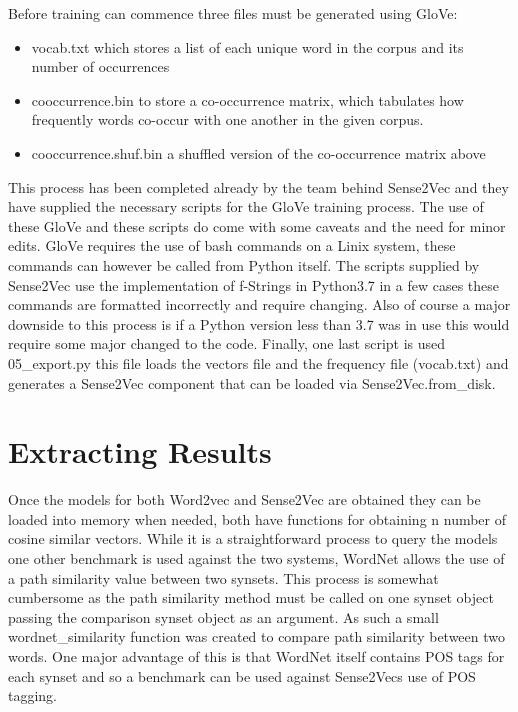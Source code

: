 Before training can commence three files must be generated using GloVe: 
\begin{itemize}
  \item vocab.txt which stores a list of each unique word in the corpus and its number of occurrences
  \item cooccurrence.bin to store a co-occurrence matrix, which tabulates how frequently words co-occur with one another in the given corpus.
  \item cooccurrence.shuf.bin a shuffled version of the co-occurrence matrix above
\end{itemize}
This process has been completed already by the team behind Sense2Vec and they have supplied the necessary scripts for the GloVe training process. The use of these GloVe and these scripts do come with some caveats and the need for minor edits. GloVe requires the use of bash commands on a Linix system, these commands can however be called from Python itself. The scripts supplied by Sense2Vec use the implementation of f-Strings in Python3.7 in a few cases these commands are formatted incorrectly and require changing. Also of course a major downside to this process is if a Python version less than 3.7 was in use this would require some major changed to the code. Finally, one last script is used 05\_export.py this file loads the vectors file and the frequency file (vocab.txt) and generates a Sense2Vec component that can be loaded via Sense2Vec.from\_disk.

\section{Extracting Results}
Once the models for both Word2vec and Sense2Vec are obtained they can be loaded into memory when needed, both have functions for obtaining n number of cosine similar vectors. While it is a straightforward process to query the models one other benchmark is used against the two systems, WordNet allows the use of a path similarity value between two synsets. This process is somewhat cumbersome as the path similarity method must be called on one synset object passing the comparison synset object as an argument. As such a small wordnet\_similarity function was created to compare path similarity between two words. One major advantage of this is that WordNet itself contains POS tags for each synset and so a benchmark can be used against Sense2Vecs use of POS tagging.

